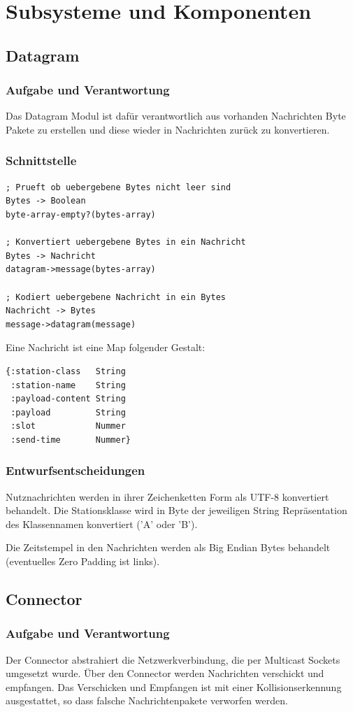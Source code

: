 \documentclass[draft=false
              ,paper=a4
              ,twoside=false
              ,fontsize=11pt
              ,headsepline
              ,BCOR10mm
              ,DIV11
              ]{scrbook}
\begin{document}
\chapter{Subsysteme und Komponenten}
\section{Datagram}
\subsection{Aufgabe und Verantwortung}
Das Datagram Modul ist dafür verantwortlich aus vorhanden Nachrichten Byte Pakete zu erstellen und diese wieder in Nachrichten zurück zu konvertieren.

\subsection{Schnittstelle}
\begin{lstlisting}
; Prueft ob uebergebene Bytes nicht leer sind
Bytes -> Boolean
byte-array-empty?(bytes-array)

; Konvertiert uebergebene Bytes in ein Nachricht
Bytes -> Nachricht
datagram->message(bytes-array)

; Kodiert uebergebene Nachricht in ein Bytes
Nachricht -> Bytes
message->datagram(message)
\end{lstlisting}
Eine Nachricht ist eine Map folgender Gestalt:
\begin{lstlisting}
{:station-class   String
 :station-name    String
 :payload-content String
 :payload         String
 :slot            Nummer
 :send-time       Nummer}
\end{lstlisting}

\subsection{Entwurfsentscheidungen}
Nutznachrichten werden in ihrer Zeichenketten Form als UTF-8 konvertiert behandelt. Die Stationsklasse wird in Byte der jeweiligen String Repräsentation des Klassennamen konvertiert ('A' oder 'B').

Die Zeitstempel in den Nachrichten werden als Big Endian Bytes behandelt (eventuelles Zero Padding ist links).

\section{Connector}
\subsection{Aufgabe und Verantwortung}
Der Connector abstrahiert die Netzwerkverbindung, die per Multicast Sockets umgesetzt wurde. Über den Connector werden Nachrichten verschickt und empfangen. Das Verschicken und Empfangen ist mit einer Kollisionserkennung ausgestattet, so dass falsche Nachrichtenpakete verworfen werden.
\end{document}
